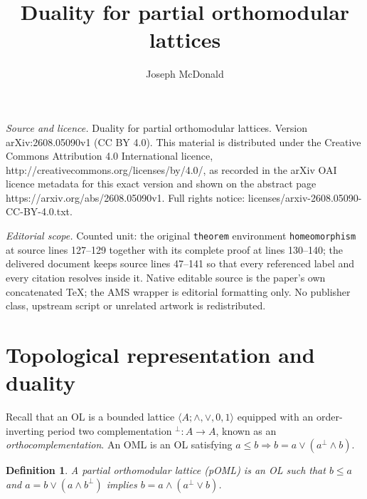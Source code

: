 \documentclass[10pt,a4paper]{amsart}
\newtheorem{definition}[theorem]{Definition}
\newtheorem{example}[theorem]{Example}
\begin{document}
\title[Duality for partial orthomodular lattices]{Duality for partial orthomodular lattices}
\author{Joseph McDonald}
\date{}
\maketitle
\noindent\emph{Source and licence.} Duality for partial orthomodular lattices. Version arXiv:2608.05090v1 (CC BY 4.0). This material is distributed under the Creative Commons Attribution 4.0 International licence, http://creativecommons.org/licenses/by/4.0/, as recorded in the arXiv OAI licence metadata for this exact version and shown on the abstract page https://arxiv.org/abs/2608.05090v1. Full rights notice: licenses/arxiv-2608.05090-CC-BY-4.0.txt.\par\smallskip
\noindent\textit{Editorial scope.} Counted unit: the original \texttt{theorem} environment \texttt{homeomorphism} at source lines 127--129 together with its complete proof at lines 130--140; the delivered document keeps source lines 47--141 so that every referenced label and every citation resolves inside it. Native editable source is the paper's own concatenated TeX; the AMS wrapper is editorial formatting only. No publisher class, upstream script or unrelated artwork is redistributed.
\section{Topological representation and duality}
Recall that an OL is a bounded lattice $\langle A;\wedge,\vee,0,1\rangle$ equipped with an order-inverting period two complementation $^\perp\colon A\to A$, known as an \emph{orthocomplementation}. An OML is an OL satisfying $a\leq b\Rightarrow b=a\vee(a^{\perp}\wedge b)$. 
\begin{definition}
    A \emph{partial orthomodular lattice} (\emph{pOML}) is an OL such that  $b\leq a$ and $a=b\vee(a\wedge b^{\perp})$ implies $b=a\wedge(a^{\perp}\vee b)$.  
\end{definition}
\end{document}
